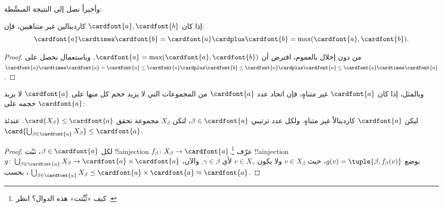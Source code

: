 \documentclass[../../../include/open-logic-section]{subfiles}
\begin{document}
وأخيراً نصل إلى النتيجة المبسِّطة:

\begin{thm}
إذا كان $\cardfont{a}, \cardfont{b}$ كاردينالين غير متناهيين، فإن:
\[
	\cardfont{a}
\cardtimes \cardfont{b} = \cardfont{a} \cardplus \cardfont{b} =
\text{max}(\cardfont{a}, \cardfont{b}).
\]
\end{thm}

\begin{proof}
من دون إخلال بالعموم، افترض أن
$\cardfont{a} = \max(\cardfont{a}, \cardfont{b})$. وباستعمال
 نحصل على
$\cardfont{a}\cardtimes\cardfont{a} = \cardfont{a} \leq \cardfont{a}
\cardplus \cardfont{b} \leq \cardfont{a} \cardplus \cardfont{a} \leq
\cardfont{a} \cardtimes \cardfont{a}$.
\end{proof}\noindent
وبالمثل، إذا كان $\cardfont{a}$ غير متناهٍ، فإن اتحاد عدد
$\cardfont{a}$ من المجموعات التي لا يزيد حجم كل منها على
$\cardfont{a}$ لا يزيد حجمه على $\cardfont{a}$:

\begin{prop}
ليكن $\cardfont{a}$ كاردينالاً غير متناهٍ. ولكل عدد ترتيبي
$\beta \in \cardfont{a}$، لتكن $X_\beta$ مجموعة تحقق
$\card{X_\beta} \leq \cardfont{a}$. عندئذ
$\card{\bigcup_{\beta \in \cardfont{a}} X_\beta} \leq \cardfont{a}$.
\end{prop}

\begin{proof}
لكل $\beta \in \cardfont{a}$، ثبّت !!a{injection}
$f_\beta \colon X_\beta \to \cardfont{a}$.\footnote{كيف «ثُبِّتت» هذه
الدوال؟ انظر .} عرّف
!!a{injection} $g \colon
\bigcup_{\beta \in \cardfont{a}} X_\beta \to \cardfont{a} \times
\cardfont{a}$ بوضع $g(v) = \tuple{\beta, f_\beta(v)}$، حيث
$v \in X_\beta$ ولا يكون $v \in X_\gamma$ لأي $\gamma \in \beta$.
والآن، بحسب ،
$\bigcup_{\beta \in \cardfont{a}} X_\beta \preceq
\cardfont{a} \times \cardfont{a} \approx \cardfont{a}$.
\end{proof}
\end{document}
